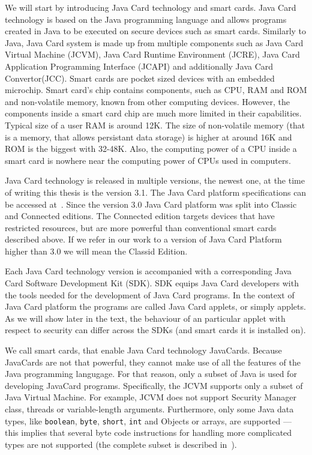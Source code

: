 We will start by introducing Java Card technology and smart cards. Java Card technology is based on the Java programming language and allows programs created in Java to be executed on secure devices such as smart cards. Similarly to Java, Java Card system is made up from multiple components such as Java Card Virtual Machine (JCVM), Java Card Runtime Environment (JCRE), Java Card Application Programming Interface (JCAPI) and additionally Java Card Convertor(JCC).  Smart cards are pocket sized devices with an embedded microchip. Smart card's chip contains components, such as CPU, RAM and ROM and non-volatile memory, known from other computing devices. However, the components inside a smart card chip are much more limited in their capabilities. Typical size of a user RAM is around 12K. The size of non-volatile memory (that is a memory, that allows persistant data storage) is higher at around 16K and ROM is the biggest with 32-48K. Also, the computing power of a CPU inside a smart card is nowhere near the computing power of CPUs used in computers.

Java Card technology is released in multiple versions, the newest one, at the time of writing this thesis is the version 3.1. The Java Card platform specifications can be accessed at~\cite{jcspecs31download}. Since the version 3.0 Java Card platform was split into Classic and Connected editions. The Connected edition targets devices that have restricted resources, but are more powerful than conventional smart cards described above. If we refer in our work to a version of Java Card Platform higher than 3.0 we will mean the Classid Edition.


Each Java Card technology version is accompanied with a corresponding Java Card Software Development Kit (SDK). SDK equips Java Card developers with the tools needed for the development of Java Card programs. In the context of Java Card platform the programs are called Java Card applets, or simply applets. As we will show later in the text, the behaviour of an particular applet with respect to security can differ across the SDKs (and smart cards it is installed on).


We call smart cards, that enable Java Card technology JavaCards. Because JavaCards are not that powerful, they cannot make use of all the features of the Java programming langugage. For that reason, only a subset of Java is used for developing JavaCard programs. Specifically, the JCVM supports only a subset of Java Virtual Machine. For example, JCVM does not support Security Manager class, threads or variable-length arguments. Furthermore, only some Java data types, like \texttt{boolean}, \texttt{byte}, \texttt{short}, \texttt{int} and Objects or arrays, are supported --- this implies that several byte code instructions for handling more complicated types are not supported (the complete subset is described in~\cite{jcspecs31download}).



